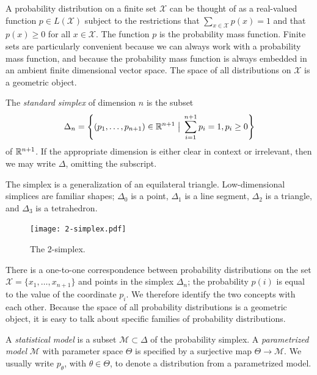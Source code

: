 \documentclass[cclicense]{hmcthesis}
\providecommand*{\xs}{\mathcal X}
\providecommand*{\ms}{\mathcal M}
\newcommand*{\vbar}{\;\big\vert\;}
\numberwithin{equation}{chapter}
\numberwithin{thmcounter}{chapter}
\begin{document}
    A probability distribution on a finite set $\xs$ can be thought of as a
    real-valued function $p \in L(\xs)$ subject to the restrictions that
    $\sum_{x\in \xs} p(x) = 1$ and that $p(x) \ge 0$ for all $x \in \xs$.  The
    function $p$ is the probability mass function.  Finite sets are particularly
    convenient because we can always work with a probability mass function, and
    because the probability mass function is always embedded in an ambient
    finite dimensional vector space.  The space of all distributions on $\xs$ is
    a geometric object.
    
    \begin{definition} 
        The \emph{standard simplex} of dimension $n$ is the subset
        \[
            \Delta_n = 
            \left\{(p_1, \ldots, p_{n+1}) \in \R^{n+1} \vbar 
            \sum_{i=1}^{n+1} p_i= 1, p_i \ge 0 \right\} 
        \]
        of $\mathbb{R}^{n+1}$.  If the appropriate dimension is either clear in context
        or irrelevant, then we may write $\Delta$, omitting the subscript.
    \end{definition}

    The simplex is a generalization of an equilateral triangle.  Low-dimensional
    simplices are familiar shapes; $\Delta_0$ is a point, $\Delta_1$ is a line
    segment, $\Delta_2$ is a triangle, and $\Delta_3$ is a tetrahedron.

    \begin{figure}[H]
        \centering
        \texttt{[image: 2-simplex.pdf]}
        \caption{The 2-simplex.}
    \end{figure}

    There is a one-to-one correspondence between probability distributions on
    the set $\xs = \{x_1, \ldots, x_{n+1}\}$ and points in the simplex
    $\Delta_n$; the probability $p(i)$ is equal to the value of the coordinate
    $p_i$.  We therefore identify the two concepts with each other.
    Because the space of all probability distributions is a geometric
    object, it is easy to talk about specific families of probability
    distributions.

    \begin{definition}
    A \emph{statistical model} is a subset $\ms \subset \Delta$ of the
    probability simplex.  A \emph{parametrized model} $\ms$ with parameter space
    $\Theta$ is specified by a surjective map $\Theta \to \ms$.  We usually
    write $p_\theta$, with $\theta \in \Theta$, to denote a distribution from a
    parametrized model.
    \end{definition}
\end{document}
